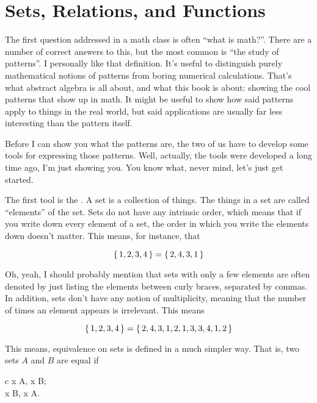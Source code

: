 \chapter{Sets, Relations, and Functions}
\label{ch:functions}

The first question addressed in a math class is often ``what is math?''. There
are a number of correct answers to this, but the most common is ``the study of
patterns''. I personally like that definition. It's useful to distinguish purely
mathematical notions of patterns from boring numerical calculations. That's what
abstract algebra is all about, and what this book is about: showing the cool
patterns that show up in math. It might be useful to show how said patterns
apply to things in the real world, but said applications are usually far less
interesting than the pattern itself.

Before I can show you what the patterns are, the two of us have to develop some
tools for expressing those patterns. Well, actually, the tools were developed a
long time ago, I'm just showing you. You know what, never mind, let's just get
started.

The first tool is the . A set is a collection of things. The things in
a set are called ``elements'' of the set. Sets do not have any intrinsic order,
which means that if you write down every element of a set, the order in which
you write the elements down doesn't matter. This means, for instance, that

\begin{equation}
  \left\{\, 1,2,3,4 \,\right\} = \left\{\, 2,4,3,1 \,\right\}
\end{equation}

Oh, yeah, I should probably mention that sets with only a few elements are often
denoted by just listing the elements between curly braces, separated by
commas. In addition, sets don't have any notion of multiplicity, meaning that
the number of times an element appears is irrelevant. This means

\begin{equation}
  \left\{\, 1,2,3,4 \,\right\} = \left\{\, 2,4,3,1,2,1,3,3,4,1,2 \,\right\}
\end{equation}

This means, equivalence on sets is defined in a much simpler way. That is, two
sets $A$ and $B$ are equal if

\begin{alignmath}{c}
  \forall x \in A, x \in B;  \\
  \forall x \in B, x \in A.
\end{alignmath}

